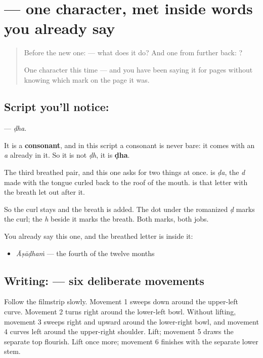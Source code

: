 \section[\texorpdfstring{\te{ఢ} (ḍha)}{ఢ (ḍha)}]{ — one character, met inside words you already say}

\label{lesson:TE-S139-letter-ddha}



\begin{quote}
Before the new one:  — what does it do? And one from further back: ?

One character this time — and you have been saying it for pages without knowing which mark on the page it was.
\end{quote}

\subsection*{Script you'll notice: }
\textbf{} — \emph{ḍha}.

It is a \textbf{consonant}, and in this script a consonant is never bare: it comes with an \emph{a} already in it. So it is not \emph{ḍh}, it is \textbf{ḍha}.

The third breathed pair, and this one asks for two things at once. \textbf{} is \emph{ḍa}, the \emph{d} made with the tongue curled back to the roof of the mouth. \textbf{} is that letter with the breath let out after it.

So the curl stays and the breath is added. The dot under the romanized \emph{ḍ} marks the curl; the \emph{h} beside it marks the breath. Both marks, both jobs.

You already say this one, and the breathed letter is inside it:

\begin{itemize}
\raggedright
  \item \textbf{} \emph{Āṣāḍhaṁ} — the fourth of the twelve months
\end{itemize}

\subsection*{Writing:  — six deliberate movements}

Follow the filmstrip slowly. Movement 1 sweeps down around the upper-left curve. Movement 2 turns right around the lower-left bowl. Without lifting, movement 3 sweeps right and upward around the lower-right bowl, and movement 4 curves left around the upper-right shoulder. Lift; movement 5 draws the separate top flourish. Lift once more; movement 6 finishes with the separate lower stem.

